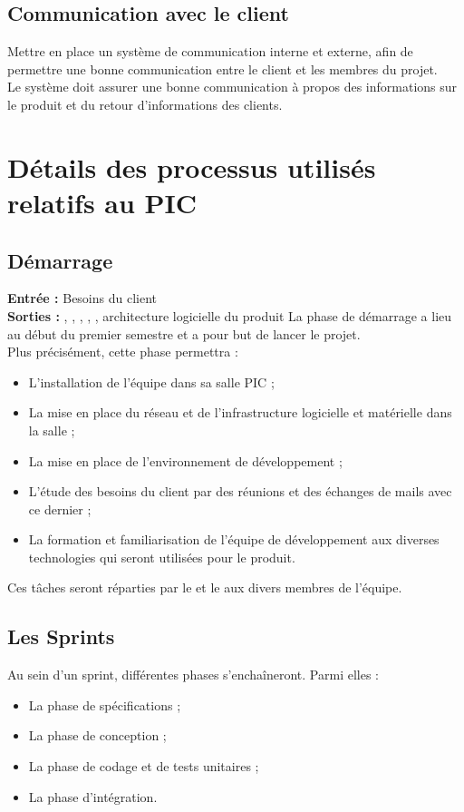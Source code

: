 \subsection{Communication avec le client}

Mettre en place un système de communication interne et externe, afin de permettre une bonne communication entre le client et les membres du projet.\\
 Le système doit assurer une bonne communication à propos des informations sur le produit et du retour d’informations des clients.

\section{Détails des processus utilisés relatifs au PIC}

\subsection{Démarrage}

\textbf{Entrée :} Besoins du client \\
\textbf{Sorties :} \DSECourt , \DSICourt , \PTUCourt , \PTICourt , \PTVCourt , architecture logicielle du produit
La phase de démarrage a lieu au début du premier semestre et a pour but de lancer le projet. \\
Plus précisément, cette phase permettra :
\begin{itemize}


\item L’installation de l’équipe dans sa salle PIC ;
\item  La mise en place du réseau et de l’infrastructure logicielle et matérielle dans la salle ;
\item La mise en place de l’environnement de développement ;
\item  L’étude des besoins du client par des réunions et des échanges de mails avec ce dernier ;
\item La formation et familiarisation de l’équipe de développement aux diverses technologies qui seront utilisées pour le produit.
\end{itemize}
Ces tâches seront réparties par le \CP et le \CPA{} aux divers membres de l’équipe.

\subsection{Les Sprints}
Au sein d’un sprint, différentes phases s’enchaîneront. Parmi elles :
\begin{itemize}
\item La phase de spécifications ;
\item La phase de conception ;
\item La phase de codage et de tests unitaires ;
\item La phase d’intégration.
\end{itemize}

